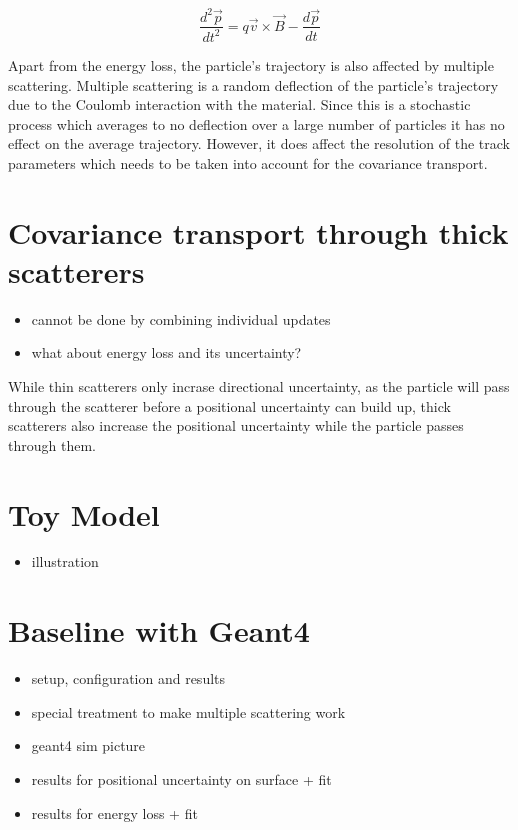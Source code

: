 \begin{equation}
    \frac{d^2\vec{p}}{dt^2} = q \vec{v} \times \vec{B} - \frac{d\vec{p}}{dt}
\end{equation}

Apart from the energy loss, the particle's trajectory is also affected by multiple scattering. Multiple scattering is a random deflection of the particle's trajectory due to the Coulomb interaction with the material. Since this is a stochastic process which averages to no deflection over a large number of particles it has no effect on the average trajectory. However, it does affect the resolution of the track parameters which needs to be taken into account for the covariance transport.

\section{Covariance transport through thick scatterers}

\begin{itemize}
    \color{red}
    \item cannot be done by combining individual updates
    \item what about energy loss and its uncertainty?
\end{itemize}

While thin scatterers only incrase directional uncertainty, as the particle will pass through the scatterer before a positional uncertainty can build up, thick scatterers also increase the positional uncertainty while the particle passes through them.

\section{Toy Model}

\begin{itemize}
    \color{red}
    \item illustration
\end{itemize}

\section{Baseline with Geant4}

\begin{itemize}
    \color{red}
    \item setup, configuration and results
    \item special treatment to make multiple scattering work
    \item geant4 sim picture
    \item results for positional uncertainty on surface + fit
    \item results for energy loss + fit
\end{itemize}


